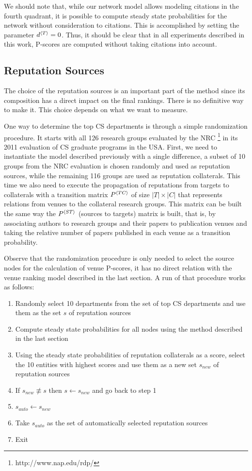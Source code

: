 \documentclass[notitlepage]{svjour3}
\begin{document}
We should note that, while our network model allows modeling citations in the fourth quadrant, it is possible to compute 
steady state probabilities for the network without consideration to citations. This is accomplished by setting the parameter 
$d{^{\langle T \rangle}} = 0$. 
Thus, it should be clear that in all experiments described in this work, P-scores 
are computed without taking citations into account. 


\subsection{Reputation Sources}
\label{sec:rep-sources}

The choice of the reputation sources is an important part of the method since 
its composition has a direct impact on the final rankings. 
There is no definitive way to make it. This choice depends on what we want to measure. 

One way to determine the top CS departments is through a simple randomization procedure.
It starts with all 126 research groups evaluated by the NRC \footnote{http://www.nap.edu/rdp/}
in its 2011 evaluation of CS graduate programs in the USA. 
First, we need to instantiate the model described previously with a single difference, 
a subset of 10 groups from the NRC evaluation is chosen randomly and used as reputation sources, while the remaining 116 groups
are used as reputation collaterals. This time we also need to execute the propagation of reputations 
from targets to collaterals with a transition matrix $P{^{\langle TC \rangle}}$ of size $|T|\times |C|$ that represents
relations from venues to the collateral research groups. This matrix can be built the same way
the $P{^{\langle ST \rangle}}$ (sources to targets) matrix is built, that is, by associating authors to research 
groups and their papers to publication venues and taking the relative number of papers published
in each venue as a transition probability.

Observe that the randomization procedure is only needed to
select the source nodes for the calculation of venue P-scores, it has no direct relation with the venue ranking
model described in the last section. A run of that procedure works as follows: 
\begin{enumerate}
\item Randomly select 10 departments from the set of top CS departments and use them as the set $s$ of reputation sources
\item Compute steady state probabilities for all nodes using the method described in the last section
\item Using the steady state probabilities of reputation collaterals as a score, select the 10 entities with 
highest scores and use them as a new set $s_{new}$ of reputation sources
\item If $s_{new} \not \equiv s$ then $s \leftarrow s_{new}$ and go back to step 1
\item $s_{auto} \leftarrow s_{new}$ 
\item Take $s_{auto}$ as the set of automatically selected reputation sources
\item Exit
\end{enumerate}
\end{document}
